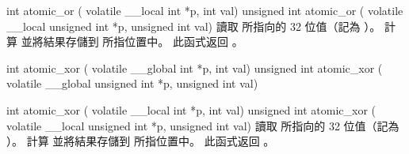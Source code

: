 int atomic_or (
	volatile __local int *p,
	int val)
unsigned int atomic_or (
	volatile __local unsigned int *p,
	unsigned int val)
\stopbuffer
{}
讀取  所指向的 32 位值（記為 ）。
計算  並將結果存儲到  所指位置中。
此函式返回 。
\stopbuffer

int atomic_xor (
	volatile __global int *p,
	int val)
unsigned int atomic_xor (
	volatile __global unsigned int *p,
	unsigned int val)

int atomic_xor (
	volatile __local int *p,
	int val)
unsigned int atomic_xor (
	volatile __local unsigned int *p,
	unsigned int val)
\stopbuffer
{}
讀取  所指向的 32 位值（記為 ）。
計算  並將結果存儲到  所指位置中。
此函式返回 。
\stopbuffer


\startCLFD
{}
\stopCLFD

